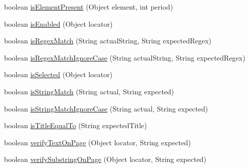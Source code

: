 \begin{DoxyCompactItemize}
\item 
boolean \hyperlink{classcom_1_1zeuslearning_1_1automation_1_1selenium_1_1interactions_1_1Verifications_ace7cafb4b24bcba420f997a1bcc9ac6c}{is\+Element\+Present} (Object element, int period)
\item 
boolean \hyperlink{classcom_1_1zeuslearning_1_1automation_1_1selenium_1_1interactions_1_1Verifications_af83849f7939e2df11760140e6eea3eb0}{is\+Enabled} (Object locator)
\item 
boolean \hyperlink{classcom_1_1zeuslearning_1_1automation_1_1selenium_1_1interactions_1_1Verifications_a748c1f8423f37a1d61524e34d30370ab}{is\+Regex\+Match} (String actual\+String, String expected\+Regex)
\item 
boolean \hyperlink{classcom_1_1zeuslearning_1_1automation_1_1selenium_1_1interactions_1_1Verifications_aec4f646bd4791291b242ad202fd928ea}{is\+Regex\+Match\+Ignore\+Case} (String actual\+String, String expected\+Regex)
\item 
boolean \hyperlink{classcom_1_1zeuslearning_1_1automation_1_1selenium_1_1interactions_1_1Verifications_a1b059d92d48f2d58bafddcef7deb3a54}{is\+Selected} (Object locator)
\item 
boolean \hyperlink{classcom_1_1zeuslearning_1_1automation_1_1selenium_1_1interactions_1_1Verifications_aebf1b991764984120a1f05adb69fdc4d}{is\+String\+Match} (String actual, String expected)
\item 
boolean \hyperlink{classcom_1_1zeuslearning_1_1automation_1_1selenium_1_1interactions_1_1Verifications_af7b6b23977e6ef4e53a2a4f0d606e26e}{is\+String\+Match\+Ignore\+Case} (String actual, String expected)
\item 
boolean \hyperlink{classcom_1_1zeuslearning_1_1automation_1_1selenium_1_1interactions_1_1Verifications_ad9c55fe144291c194e182b1b2b213da5}{is\+Title\+Equal\+To} (String expected\+Title)
\item 
boolean \hyperlink{classcom_1_1zeuslearning_1_1automation_1_1selenium_1_1interactions_1_1Verifications_a041fe10631722deb8bd5f5f20760cd0c}{verify\+Text\+On\+Page} (Object locator, String expected)
\item 
boolean \hyperlink{classcom_1_1zeuslearning_1_1automation_1_1selenium_1_1interactions_1_1Verifications_a6fbe5c6cd7a92208444c669cca7cb502}{verify\+Substring\+On\+Page} (Object locator, String expected)
\end{DoxyCompactItemize}
